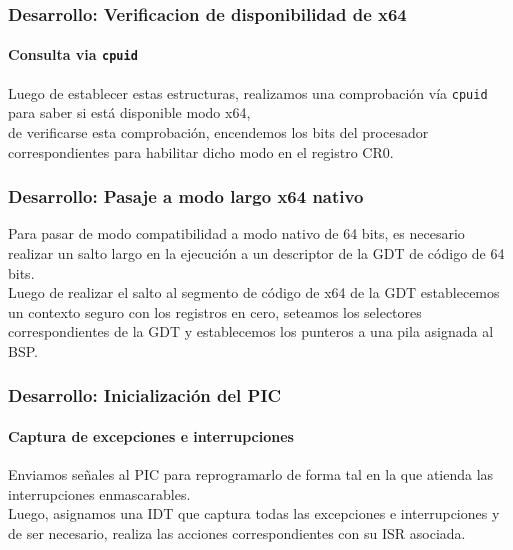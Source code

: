 \documentclass{beamer}
\begin{document}
\begin{frame}
  \frametitle{Desarrollo: Verificacion de disponibilidad de x64}
  \framesubtitle{Consulta via \texttt{cpuid}}
  Luego de establecer estas estructuras, realizamos una comprobación vía \texttt{cpuid} para saber si está disponible modo x64, \\ 
  \vspace{20pt}
  de verificarse esta comprobación, encendemos los bits del procesador correspondientes para habilitar dicho modo en el registro CR0.
\end{frame}

\begin{frame}
  \frametitle{Desarrollo: Pasaje a modo largo x64 nativo}
  Para pasar de modo compatibilidad a modo nativo de 64 bits, es necesario realizar un salto largo en la ejecución a un descriptor de la GDT de código de 64 bits.\\
  \vspace{20pt}
  Luego de realizar el salto al segmento de código de x64 de la GDT establecemos un contexto seguro con los registros en cero, seteamos los selectores correspondientes de la GDT y establecemos los punteros a una pila asignada al BSP.
\end{frame}

\begin{frame}
  \frametitle{Desarrollo: Inicialización del PIC}
  \framesubtitle{Captura de excepciones e interrupciones}
  Enviamos señales al PIC para reprogramarlo de forma tal en la que atienda las interrupciones enmascarables.\\
  \vspace{20pt}
  Luego, asignamos una IDT que captura todas las excepciones e interrupciones y de ser necesario, realiza las acciones correspondientes con su ISR asociada.
\end{frame}

\end{document}
